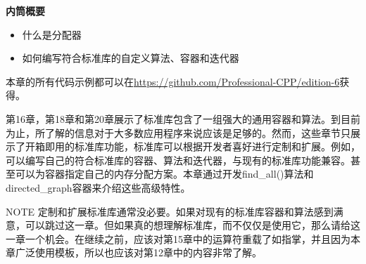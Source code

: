 \noindent
\textbf{内筒概要}

\begin{itemize}
\item
什么是分配器

\item
如何编写符合标准库的自定义算法、容器和迭代器
\end{itemize}

本章的所有代码示例都可以在\url{https://github.com/Professional-CPP/edition-6}获得。

第16章，第18章和第20章展示了标准库包含了一组强大的通用容器和算法。到目前为止，所了解的信息对于大多数应用程序来说应该是足够的。然而，这些章节只展示了开箱即用的标准库功能，标准库可以根据开发者喜好进行定制和扩展。例如，可以编写自己的符合标准库的容器、算法和迭代器，与现有的标准库功能兼容。甚至可以为容器指定自己的内存分配方案。本章通过开发find\_all()算法和directed\_graph容器来介绍这些高级特性。

\begin{myNotic}{NOTE}
定制和扩展标准库通常没必要。如果对现有的标准库容器和算法感到满意，可以跳过这一章。但如果真的想理解标准库，而不仅仅是使用它，那么请给这一章一个机会。在继续之前，应该对第15章中的运算符重载了如指掌，并且因为本章广泛使用模板，所以也应该对第12章中的内容非常了解。
\end{myNotic}


